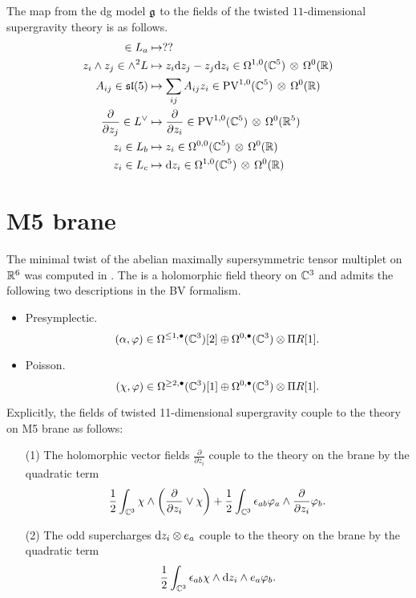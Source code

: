 \documentclass[11pt]{amsart}
\def\PV{{\rm PV}}
\def\hotimes{\, \otimes \,}
\def\ep{\epsilon}
\def\lie#1{\ensuremath{\mathfrak{#1}}}
\begin{document}
The map from the dg model $\mathfrak g$ to the fields of the twisted $11$-dimensional supergravity theory is as follows. 
\begin{align*}
 \in L_a & \mapsto ?? \\
z_i \wedge z_j \in \wedge^2 L & \mapsto z_i \d z_j - z_j \d z_i \in \Omega^{1,0} (\CC^5) \hotimes \Omega^0 (\RR) \\
A_{ij} \in \lie{sl}(5) & \mapsto \sum_{ij} A_{ij} z_i \in \PV^{1,0}(\CC^5) \hotimes \Omega^0(\RR) \\\frac{\partial}{\partial z_j} \in L^\vee & \mapsto
\frac{\partial}{\partial z_i} \in \PV^{1,0} (\CC^5) \hotimes \Omega^0 (\RR^5) \\ z_i \in L_b & \mapsto z_i \in \Omega^{0,0}(\CC^5) \hotimes \Omega^0 (\RR) \\
z_i \in L_c & \mapsto \d z_i \in \Omega^{1,0}(\CC^5) \hotimes \Omega^0 (\RR)
\end{align*}

\section{M5 brane}

The minimal twist of the abelian maximally supersymmetric tensor multiplet on $\mathbb R^6$ was computed in \cite{SWpre}. 
The is a holomorphic field theory on $\mathbb C^3$ and admits the following two descriptions in the BV formalism.

\begin{itemize}
\item Presymplectic. 
\[
(\alpha, \varphi) \in \Omega^{\leq 1, \bullet}(\mathbb C^3)[2] \oplus \Omega^{0,\bullet}(\mathbb C^3) \otimes \Pi R [1] .
\]
\item Poisson.
\[
(\chi, \varphi) \in \Omega^{\geq 2, \bullet}(\mathbb C^3)[1] \oplus \Omega^{0,\bullet}(\mathbb C^3) \otimes \Pi R [1].
\]
\end{itemize}

Explicitly, the fields of twisted 11-dimensional supergravity couple to the theory on M5 brane as follows:
\begin{itemize}
\item[(1)] The holomorphic vector fields $\frac{\partial}{\partial z_i}$ couple to the theory on the brane by the quadratic term
\[
\frac12 \int_{\CC^3} \chi \wedge \left(\frac{\partial}{\partial z_i} \vee \chi\right) + \frac12 \int_{\CC^3} \ep_{ab} \varphi_a \wedge \frac{\partial}{\partial z_i} \varphi_b .
\]
\item[(2)] The odd supercharges ${\rm d} z_i \otimes e_a$ couple to the theory on the brane by the quadratic term 
\[
\frac12 \int_{\CC^3} \ep_{ab} \chi \wedge \d z_i \wedge e_a \varphi_b .
\]
\end{itemize}
\end{document}
